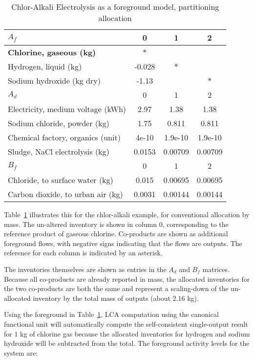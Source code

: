 \begin{table}
  \begin{center}
  \caption{Chlor-Alkali Electrolysis as a foreground model, partitioning allocation}
  \label{tbl:partition}
  \footnotesize\sffamily
  \begin{tabular}{l|ccc}
    \midrule
    \bf $A_f$ & 0 & 1 & 2 \\
    \midrule
    \textbf{Chlorine, gaseous (kg)} & $\ast$ & & \\
    Hydrogen, liquid (kg) & -0.028 & $\ast$ & \\
    Sodium hydroxide (kg dry) & -1.13 & & $\ast$ \\
    \midrule
    \bf $A_d$ & 0 & 1 & 2 \\
    \midrule
    Electricity, medium voltage (kWh) & 2.97 & 1.38 & 1.38 \\
    Sodium chloride, powder (kg) & 1.75 & 0.811 & 0.811 \\
    Chemical factory, organics (unit) & 4e-10 & 1.9e-10 & 1.9e-10 \\
    Sludge, NaCl electrolysis (kg) & 0.0153 & 0.00709 & 0.00709 \\
    \midrule
    \bf $B_f$ & 0 & 1 & 2 \\
    \midrule
    Chloride, to surface water (kg) & 0.015 & 0.00695 & 0.00695 \\
    Carbon dioxide, to urban air (kg) & 0.0031 & 0.00144 & 0.00144 \\
    \midrule
  \end{tabular}
  \end{center}
\end{table}
    

Table~\ref{tbl:partition} illustrates this for the chlor-alkali example, for conventional allocation by mass.  The un-altered inventory is shown in column $0$, corresponding to the reference product of gaseous chlorine.  Co-products are shown as additional foreground flows, with negative signs indicating that the flows are outputs.  The reference for each column is indicated by an asterisk.

The inventories themselves are shown as entries in the $A_d$ and $B_f$ matrices. Because all co-products are already reported in mass, the allocated inventories for the two co-products are both the same and represent a scaling-down of the un-allocated inventory by the total mass of outputs (about 2.16 kg).

Using the foreground in Table~\ref{tbl:partition}, LCA computation using the canonical functional unit will automatically compute the self-consistent single-output result for 1 kg of chlorine gas because the allocated inventories for hydrogen and sodium hydroxide will be subtracted from the total.  The foreground activity levels for the system are:

